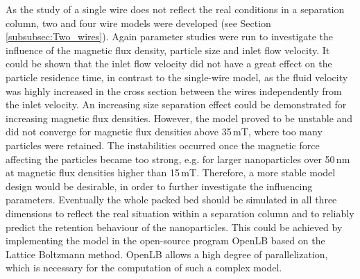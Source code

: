 As the study of a single wire does not reflect the real conditions in a separation column, two and four wire models were developed (see Section \ref{subsubsec:Two_wires}). Again parameter studies were run to investigate the influence of the magnetic flux density, particle size and inlet flow velocity. It could be shown that the inlet flow velocity did not have a great effect on the particle residence time, in contrast to the single-wire model, as the fluid velocity was highly increased in the cross section between the wires independently from the inlet velocity. An increasing size separation effect could be demonstrated for increasing magnetic flux densities. However, the model proved to be unstable and did not converge for magnetic flux densities above 35\,mT, where too many particles were retained. The instabilities occurred once the magnetic force affecting the particles became too strong, e.g. for larger nanoparticles over 50\,nm at magnetic flux densities higher than 15\,mT. Therefore, a more stable model design would be desirable, in order to further investigate the influencing parameters. Eventually the whole packed bed should be simulated in all three dimensions to reflect the real situation within a separation column and to reliably predict the retention behaviour of the nanoparticles. This could be achieved by implementing the model in the open-source program OpenLB based on the Lattice Boltzmann method. OpenLB allows a high degree of parallelization, which is necessary for the computation of such a complex model.     

